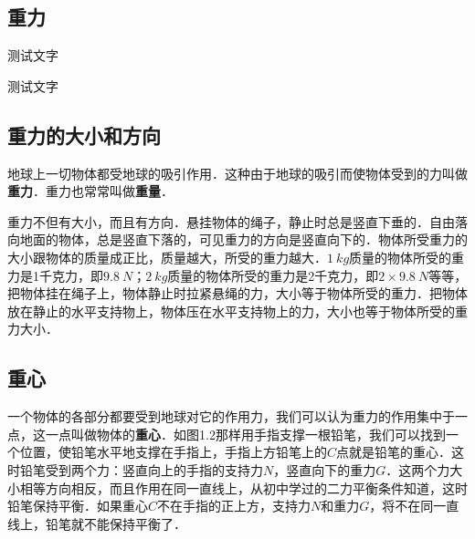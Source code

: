 \begin{Quiz}
\section{重力}


\begin{Point*}
	测试文字
\end{Point*}

\begin{Case*}
	\item 测试文字
\end{Case*}


\subsection{重力的大小和方向}
地球上一切物体都受地球的吸引作用．这种由于地球的吸引而使物体受到的力叫做\textbf{重力}．重力也常常叫做\textbf{重量}．

重力不但有大小，而且有方向．悬挂物体的绳子，静止时总是竖直下垂的．自由落向地面的物体，总是竖直下落的，可见重力的方向是竖直向下的．物体所受重力的大小跟物体的质量成正比，质量越大，所受的重力越大．$\qty{1}{kg}$质量的物体所受的重力是1千克力，即$\qty{9.8}{N}$；$\qty{2}{kg}$质量的物体所受的重力是2千克力，即$2\times \qty{9.8}{N}$等等，把物体挂在绳子上，物体静止时拉紧悬绳的力，大小等于物体所受的重力．把物体放在静止的水平支持物上，物体压在水平支持物上的力，大小也等于物体所受的重力大小．


\subsection{重心}
一个物体的各部分都要受到地球对它的作用力，我们可以认为重力的作用集中于一点，这一点叫做物体的\textbf{重心}．如图1.2那样用手指支撑一根铅笔，我们可以找到一个位置，使铅笔水平地支撑在手指上，手指上方铅笔上的$C$点就是铅笔的重心．这时铅笔受到两个力：竖直向上的手指的支持力$N$，竖直向下的重力$G$．这两个力大小相等方向相反，而且作用在同一直线上，从初中学过的二力平衡条件知道，这时铅笔保持平衡．如果重心$C$不在手指的正上方，支持力$N$和重力$G$，将不在同一直线上，铅笔就不能保持平衡了．


\end{Quiz}

